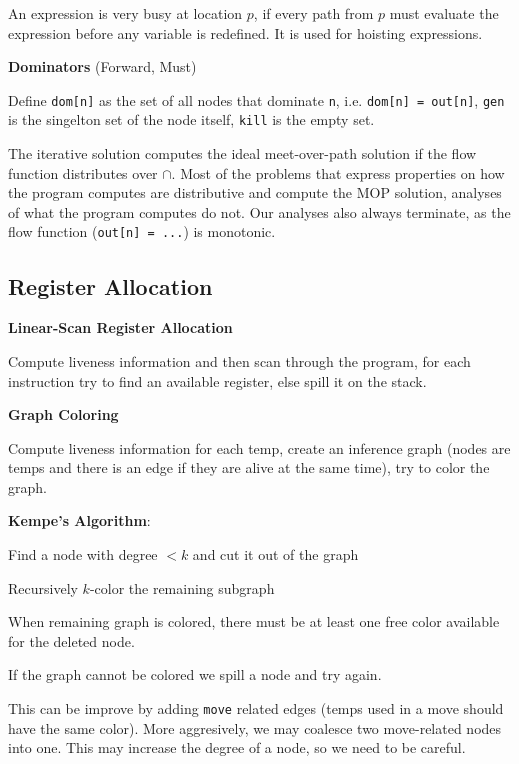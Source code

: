 An expression is very busy at location $p$, if every path from $p$ must evaluate the expression before any variable is redefined. It is used for hoisting expressions.\medskip

\textbf{Dominators} (Forward, Must)\medskip

Define \texttt{dom[n]} as the set of all nodes that dominate \texttt{n}, i.e. \texttt{dom[n] = out[n]}, \texttt{gen} is the singelton set of the node itself, \texttt{kill} is the empty set.\medskip

The iterative solution computes the ideal meet-over-path solution if the flow function distributes over $\cap$. Most of the problems that express properties on how the program computes are distributive and compute the MOP solution, analyses of what the program computes do not. Our analyses also always terminate, as the flow function (\texttt{out[n] = ...}) is monotonic.



\subsection*{Register Allocation}

\textbf{Linear-Scan Register Allocation}\medskip

Compute liveness information and then scan through the program, for each instruction try to find an available register, else spill it on the stack.\medskip
	
\textbf{Graph Coloring}\medskip

Compute liveness information for each temp, create an inference graph (nodes are temps and there is an edge if they are alive at the same time), try to color the graph.\medskip
	
\textbf{Kempe's Algorithm}: 
\begin{compactitem}
	\item Find a node with degree $< k$ and cut it out of the graph
	\item Recursively $k$-color the remaining subgraph
	\item When remaining graph is colored, there must be at least one free color available for the deleted node.
	\item If the graph cannot be colored we spill a node and try again.
\end{compactitem}\medskip

This can be improve by adding \texttt{move} related edges (temps used in a move should have the same color). More aggresively, we may coalesce two move-related nodes into one. This may increase the degree of a node, so we need to be careful. \medskip

